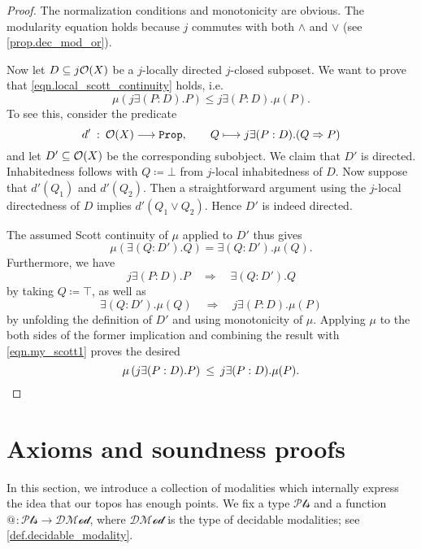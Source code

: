 \documentclass[11pt, oneside, article]{memoir}
\makeatletter
\theoremstyle{plain}
\theoremstyle{definition}
\theoremstyle{remark}
\renewcommand{\ss}{\subseteq}
\newcommand{\const}[1]{\mathtt{#1}}
\newcommand{\prop}{\const{Prop}}
\newcommand{\Op}[1][undef]{\ifthenelse{\equal{#1}{undef}}{\mathcal{O}}{\mathcal{O}(#1)}}
\newcommand{\pt}{k}				%
\newcommand{\Pts}{\mathcal{Pts}}		%
\newcommand{\decmod}{\mathcal{DMod}}
\newcommand{\AtSymbol}{{@}}
\newcommand{\At}[1][\pt]{\AtSymbol_{#1}}
\newcommand{\imp}{\Rightarrow}
\makeatother
\begin{document}
\begin{proof}
	The normalization conditions and monotonicity are obvious. The modularity equation holds because $j$ commutes with both $\land$ and $\lor$ (see \cref{prop.dec_mod_or}).

	Now let $D \ss j \Op[X]$ be a $j$-locally directed $j$-closed subposet. We want to prove that \eqref{eqn.local_scott_continuity} holds, i.e.\
	\[
		\mu\left( j \exists (P : D) . P \right) \leq j \exists (P : D). \mu(P).
	\]
To see this, consider the predicate
	\[
		d' \: : \: \Op[X] \longrightarrow \prop, \qquad Q \longmapsto j \exists (P : D) . (Q \imp P)
	\]
	and let $D'\ss\Op[X]$ be the corresponding subobject. We claim that $D'$ is directed. Inhabitedness follows with $Q \coloneqq\bot$ from $j$-local inhabitedness of $D$. Now suppose that $d'(Q_1)$ and $d'(Q_2)$. Then a straightforward argument using the $j$-local directedness of $D$ implies $d'(Q_1 \lor Q_2)$. Hence $D'$ is indeed directed.

	The assumed Scott continuity of $\mu$ applied to $D'$ thus gives
	\begin{equation}\label{eqn.my_scott1}
		\mu\left( \exists (Q : D') . Q \right) = \exists (Q : D') . \mu(Q).
	\end{equation}
	Furthermore, we have
	\[
		j \exists (P : D) . P \quad \Longrightarrow \quad \exists (Q : D') . Q
	\]
	by taking $Q \coloneqq \top$, as well as
	\[
		\exists (Q : D') . \mu(Q) \quad \Longrightarrow \quad j \exists (P : D) . \mu(P)
	\]
	by unfolding the definition of $D'$ and using monotonicity of $\mu$. Applying $\mu$ to the both sides of the former implication and combining the result with \eqref{eqn.my_scott1} proves the desired
	\[
		\mu\left( j \exists (P : D) . P \right) \: \le \: j \exists (P : D) . \mu(P).
\qedhere
	\]
\end{proof}

\chapter{Axioms and soundness proofs}

In this section, we introduce a collection of modalities which internally express the idea that our topos has enough points. We fix a type $\Pts$ and a function $\At[]\colon\Pts\to\decmod$, where $\decmod$ is the type of decidable modalities; see \cref{def.decidable_modality}. 
\end{document}
